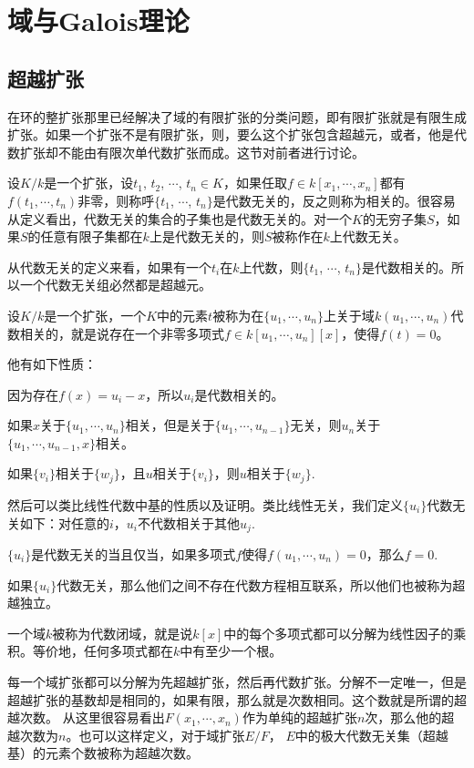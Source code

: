 \chapter{域与Galois理论}
\section{超越扩张}
在环的整扩张那里已经解决了域的有限扩张的分类问题，即有限扩张就是有限生成扩张。如果一个扩张不是有限扩张，则，要么这个扩张包含超越元，或者，他是代数扩张却不能由有限次单代数扩张而成。这节对前者进行讨论。

\para 设$K/k$是一个扩张，设$t_1$, $t_2$, $\cdots$, $t_n\in K$，如果任取$f\in k[x_1,\cdots,x_n]$都有$f(t_1,\cdots,t_n)$非零，则称呼$\{t_1$, $\cdots$, $t_n\}$是代数无关的，反之则称为相关的。很容易从定义看出，代数无关的集合的子集也是代数无关的。对一个$K$的无穷子集$S$，如果$S$的任意有限子集都在$k$上是代数无关的，则$S$被称作在$k$上代数无关。

从代数无关的定义来看，如果有一个$t_i$在$k$上代数，则$\{t_1$, $\cdots$, $t_n\}$是代数相关的。所以一个代数无关组必然都是超越元。

\para 设$K/k$是一个扩张，一个$K$中的元素$t$被称为在$\{u_1,\cdots ,u_n\}$上关于域$k(u_1,\cdots ,u_n)$代数相关的，就是说存在一个非零多项式$f\in k[u_1,\cdots ,u_n][x]$，使得$f(t)=0$。

他有如下性质：

 因为存在$f(x)=u_i-x$，所以$u_i$是代数相关的。

 如果$x$关于$\{u_1,\cdots ,u_n\}$相关，但是关于$\{u_1,\cdots ,u_{n-1}\}$无关，则$u_n$关于$\{u_1,\cdots ,u_{n-1},x\}$相关。

 如果$\{v_i\}$相关于$\{w_j\}$，且$u$相关于$\{v_i\}$，则$u$相关于$\{w_j\}$.

然后可以类比线性代数中基的性质以及证明。类比线性无关，我们定义$\{u_i\}$代数无关如下：对任意的$i$，$u_i$不代数相关于其他$u_j$.

\pro $\{u_i\}$是代数无关的当且仅当，如果多项式$f$使得$f(u_1,\cdots ,u_n)=0$，那么$f=0$.

如果$\{u_i\}$代数无关，那么他们之间不存在代数方程相互联系，所以他们也被称为超越独立。

\para 一个域$k$被称为代数闭域，就是说$k[x]$中的每个多项式都可以分解为线性因子的乘积。等价地，任何多项式都在$k$中有至少一个根。

每一个域扩张都可以分解为先超越扩张，然后再代数扩张。分解不一定唯一，但是超越扩张的基数却是相同的，如果有限，那么就是次数相同。这个数就是所谓的超越次数。 从这里很容易看出$F(x_1,\cdots ,x_n)$作为单纯的超越扩张$n$次，那么他的超越次数为$n$。也可以这样定义，对于域扩张$E/F$， $E$中的极大代数无关集（超越基）的元素个数被称为超越次数。

